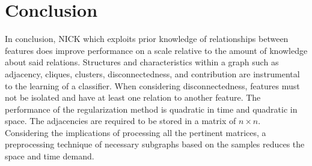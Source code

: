 \section{Conclusion}
In conclusion, NICK which exploits prior knowledge of relationships between features does improve performance on a scale relative to the amount of knowledge about said relations. Structures and characteristics within a graph such as adjacency, cliques, clusters, disconnectedness, and contribution are instrumental to the learning of a classifier. When considering disconnectedness, features must not be isolated and have at least one relation to another feature. The performance of the regularization method is quadratic in time and quadratic in space. The adjacencies are required to be stored in a matrix of $n \times n$.\\
Considering the implications of processing all the pertinent matrices, a preprocessing technique of necessary subgraphs based on the samples reduces the space and time demand. \\